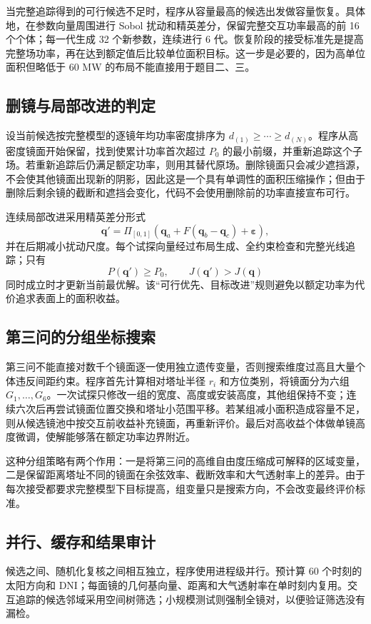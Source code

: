 \documentclass[UTF8,a4paper,11pt]{ctexart}
\newcommand{\vect}[1]{\bm{#1}}
\begin{document}
当完整追踪得到的可行候选不足时，程序从容量最高的候选出发做容量恢复。具体地，在参数向量周围进行 Sobol 扰动和精英差分，保留完整交互功率最高的前 16 个个体；每一代生成 32 个新参数，连续进行 6 代。恢复阶段的接受标准先是提高完整场功率，再在达到额定值后比较单位面积目标。这一步是必要的，因为高单位面积但略低于 60 MW 的布局不能直接用于题目二、三。

\subsection{删镜与局部改进的判定}
设当前候选按完整模型的逐镜年均功率密度排序为 $d_{(1)}\ge\cdots\ge d_{(N)}$。程序从高密度镜面开始保留，找到使累计功率首次超过 $P_0$ 的最小前缀，并重新追踪这个子场。若重新追踪后仍满足额定功率，则用其替代原场。删除镜面只会减少遮挡源，不会使其他镜面出现新的阴影，因此这是一个具有单调性的面积压缩操作；但由于删除后剩余镜的截断和遮挡会变化，代码不会使用删除前的功率直接宣布可行。

连续局部改进采用精英差分形式
\begin{equation}
 \vect q'=\Pi_{[0,1]}\left(\vect q_a+F(\vect q_b-\vect q_c)+\vect\varepsilon\right),
 \label{eq:de}
\end{equation}
并在后期减小扰动尺度。每个试探向量经过布局生成、全约束检查和完整光线追踪；只有
\begin{equation}
 P(\vect q')\ge P_0,\qquad J(\vect q')>J(\vect q)
\end{equation}
同时成立时才更新当前最优解。该“可行优先、目标改进”规则避免以额定功率为代价追求表面上的面积收益。

\subsection{第三问的分组坐标搜索}
第三问不能直接对数千个镜面逐一使用独立遗传变量，否则搜索维度过高且大量个体违反间距约束。程序首先计算相对塔址半径 $r_i$ 和方位类别，将镜面分为六组 $G_1,\ldots,G_6$。一次试探只修改一组的宽度、高度或安装高度，其他组保持不变；连续六次后再尝试镜面位置交换和塔址小范围平移。若某组减小面积造成容量不足，则从候选镜池中按交互前收益补充镜面，再重新评价。最后对高收益个体做单镜高度微调，使解能够落在额定功率边界附近。

这种分组策略有两个作用：一是将第三问的高维自由度压缩成可解释的区域变量，二是保留距离塔址不同的镜面在余弦效率、截断效率和大气透射率上的差异。由于每次接受都要求完整模型下目标提高，组变量只是搜索方向，不会改变最终评价标准。

\subsection{并行、缓存和结果审计}
候选之间、随机化复核之间相互独立，程序使用进程级并行。预计算 60 个时刻的太阳方向和 DNI；每面镜的几何基向量、距离和大气透射率在单时刻内复用。交互追踪的候选邻域采用空间树筛选；小规模测试则强制全镜对，以便验证筛选没有漏检。
\end{document}
